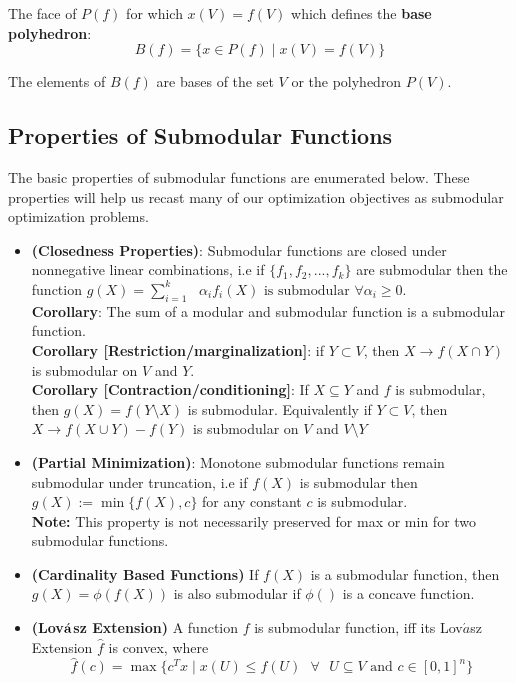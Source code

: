 The face of $P(f)$ for which $x(V) = f(V)$ which defines the {\bf base polyhedron}:\\
\[
 B(f) = \{ x \in P(f) \mid x(V) = f(V)\}
\]

The elements of $B(f)$ are bases of the set $V$ or the polyhedron $P(V)$.


\subsection{Properties of Submodular Functions}
The basic properties of submodular functions are enumerated below. These properties will help us recast many of our optimization objectives as submodular optimization problems.\\

\begin{itemize}
 \item {\bf \lemma (Closedness Properties)}: Submodular functions are closed under nonnegative linear combinations, i.e if $\{f_1,f_2,...,f_k\}$ are submodular then the function $g(X) = \sum\limits_{i=1}^k\text{ } \alpha_if_i(X) \text{ is submodular }\forall \alpha_i \geq 0$.\\
 
 {\bf Corollary}: The sum of a modular and submodular function is a submodular function.\\
 
 {\bf Corollary [Restriction/marginalization]}: if $Y\subset V$, then $X\rightarrow f(X \cap Y)$ is submodular on $V$ and $Y$.\\
 
 {\bf Corollary [Contraction/conditioning]}: If $X \subseteq Y$ and $f$ is submodular, then $g(X) = f(Y\setminus X)$ is submodular. Equivalently if $Y\subset V$, then $X\rightarrow f(X \cup Y) - f(Y)$ is submodular on $V$ and $V\setminus Y$\\
 
 \item {\bf \lemma (Partial Minimization)}: Monotone submodular functions remain submodular under truncation, i.e if $f(X)$ is submodular then $g(X) := \min\{f(X),c\}$ for any constant $c$ is submodular.\\
 
 {\bf Note:} This property is not necessarily preserved for max or min for two submodular functions.\\
 
 \item{\bf \lemma (Cardinality Based Functions)} If $f(X)$ is a submodular function, then $g(X) = \phi(f(X))$ is also submodular if $\phi()$ is a concave function.\\
 
 \item{\bf \lemma (Lov$\acute{\bf a}$sz Extension)} A function $f$ is submodular function, iff its Lov$\acute{a}$sz Extension $\hat{f}$ is convex, where
 \[
  \hat{f}(c) = \max\{c^Tx \mid x(U) \leq f(U) \text{ } \forall \text{ } U \subseteq V \text{ and } c\in[0,1]^n\}
 \]

\end{itemize}